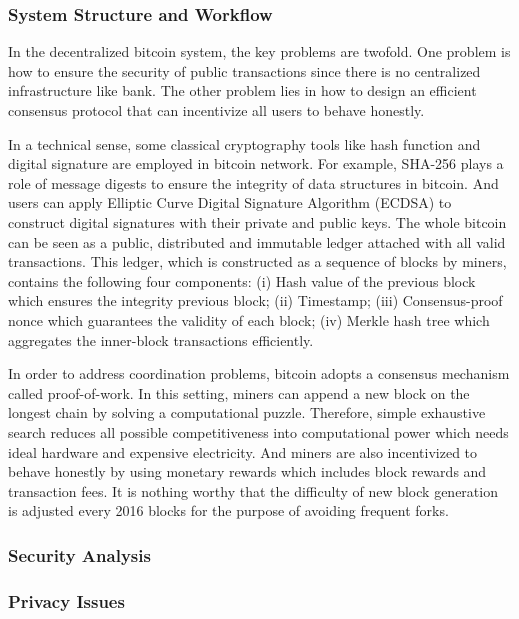 \documentclass[conference]{IEEEtran}
\begin{document}
\subsubsection{System Structure and Workflow}
In the decentralized bitcoin system, the key problems are twofold. 
%
One problem is how to ensure the security of public transactions since there is no centralized infrastructure like bank.
%
The other problem lies in how to design an efficient consensus protocol that can incentivize all users to behave honestly.

In a technical sense, some classical cryptography tools like hash function and digital signature are employed in bitcoin network.
%
For example, SHA-256 plays a role of message digests to ensure the integrity of data structures in bitcoin.
%
And users can apply Elliptic Curve Digital Signature Algorithm (ECDSA) to construct digital signatures with their private and public keys.
%
The whole bitcoin can be seen as a public, distributed and immutable ledger attached with all valid transactions.
%
This ledger, which is constructed as a sequence of blocks by miners, contains the following four components:
(i) Hash value of the previous block which ensures the integrity previous block; 
(ii) Timestamp; 
(iii) Consensus-proof nonce which guarantees the validity of each block;  
(iv) Merkle hash tree which aggregates the inner-block transactions efficiently.

In order to address coordination problems, bitcoin adopts a consensus mechanism called proof-of-work.
%
In this setting, miners can append a new block on the longest chain by solving a computational puzzle.
%
Therefore, simple exhaustive search reduces all possible competitiveness into computational power which needs ideal hardware and expensive electricity.
%
And miners are also incentivized to behave honestly by using monetary rewards which includes block rewards and transaction fees.
%
It is nothing worthy that the difficulty of new block generation is adjusted every 2016 blocks for the purpose of avoiding frequent forks.



\subsubsection{Security Analysis}

\subsubsection{Privacy Issues}
\end{document}

